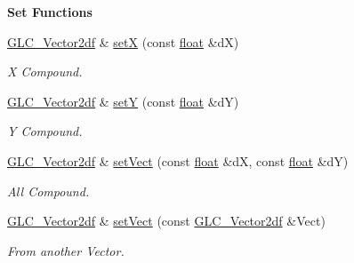 \begin{Indent}{\bf Set Functions}\par
\begin{DoxyCompactItemize}
\item 
\hyperlink{class_g_l_c___vector2df}{G\-L\-C\-\_\-\-Vector2df} \& \hyperlink{class_g_l_c___vector2df_acd6b050fbcc85fc53cf418a4a405b0d3}{set\-X} (const \hyperlink{_super_l_u_support_8h_a6a1bb6ed41f44b60e7bd83b0e9945aa7}{float} \&d\-X)
\begin{DoxyCompactList}\small\item\em X Compound. \end{DoxyCompactList}\item 
\hyperlink{class_g_l_c___vector2df}{G\-L\-C\-\_\-\-Vector2df} \& \hyperlink{class_g_l_c___vector2df_ac805b0c59d07a2cb4f853e130374cb26}{set\-Y} (const \hyperlink{_super_l_u_support_8h_a6a1bb6ed41f44b60e7bd83b0e9945aa7}{float} \&d\-Y)
\begin{DoxyCompactList}\small\item\em Y Compound. \end{DoxyCompactList}\item 
\hyperlink{class_g_l_c___vector2df}{G\-L\-C\-\_\-\-Vector2df} \& \hyperlink{class_g_l_c___vector2df_acc41017d993696c4a5aa4e552339efe3}{set\-Vect} (const \hyperlink{_super_l_u_support_8h_a6a1bb6ed41f44b60e7bd83b0e9945aa7}{float} \&d\-X, const \hyperlink{_super_l_u_support_8h_a6a1bb6ed41f44b60e7bd83b0e9945aa7}{float} \&d\-Y)
\begin{DoxyCompactList}\small\item\em All Compound. \end{DoxyCompactList}\item 
\hyperlink{class_g_l_c___vector2df}{G\-L\-C\-\_\-\-Vector2df} \& \hyperlink{class_g_l_c___vector2df_aa35c63c1f1941cfb4f5cbcfad9c4e03d}{set\-Vect} (const \hyperlink{class_g_l_c___vector2df}{G\-L\-C\-\_\-\-Vector2df} \&Vect)
\begin{DoxyCompactList}\small\item\em From another Vector. \end{DoxyCompactList}\end{DoxyCompactItemize}
\end{Indent}
